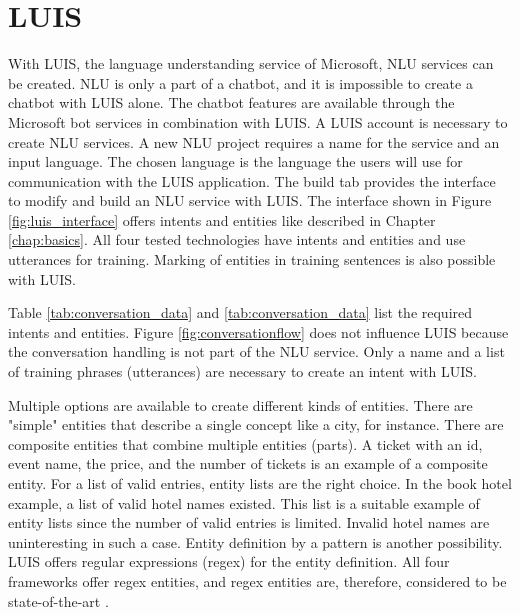 \section{LUIS}
With LUIS\cite{luisdocs}, the language understanding service of Microsoft, NLU services can be created.
NLU is only a part of a chatbot, and it is impossible to create a chatbot with LUIS alone.
The chatbot features are available through the Microsoft bot services 
in combination with LUIS.
A LUIS account is necessary to create NLU services.
A new NLU project requires a name for the service and an input language.
The chosen language is the language the users will use for communication with the LUIS application.
The build tab provides the interface to modify and build an NLU service with LUIS.
The interface shown in Figure \ref{fig:luis_interface} offers intents and entities like described in Chapter \ref{chap:basics}.
All four tested technologies have intents and entities and use utterances for training.
Marking of entities in training sentences is also possible with LUIS.

Table \ref{tab:conversation_data} and \ref{tab:conversation_data} list the required intents and entities.
Figure \ref{fig:conversationflow} does not influence LUIS because the 
conversation handling is not part of the NLU service.
Only a name and a list of training phrases (utterances) are necessary to create an intent with LUIS.

Multiple options are available to create different kinds of entities.
There are "simple" entities that describe a single concept like a city, for instance.
There are composite entities that combine multiple entities (parts).
A ticket with an id, event name, the price, and the number of tickets is an example of a composite entity.
For a list of valid entries, entity lists are the right choice.
In the book hotel example, a list of valid hotel names existed.
This list is a suitable example of entity lists since the number of valid entries is limited. 
Invalid hotel names are uninteresting in such a case.
Entity definition by a pattern is another possibility.
LUIS offers regular expressions\cite{regex} (regex) for the entity definition.
All four frameworks offer regex entities, and regex entities are, therefore, considered to be state-of-the-art .

